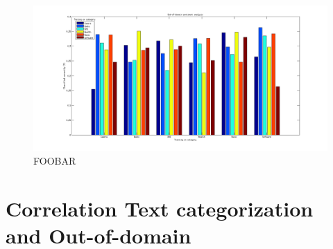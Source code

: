 \begin{figure}[h!]
\centering
\includegraphics[width=1\linewidth]{../Plottar/outofdomain.png}
\caption{FOOBAR}
\label{fig:outofdomain}
\end{figure}  

\section{Correlation Text categorization and Out-of-domain}



